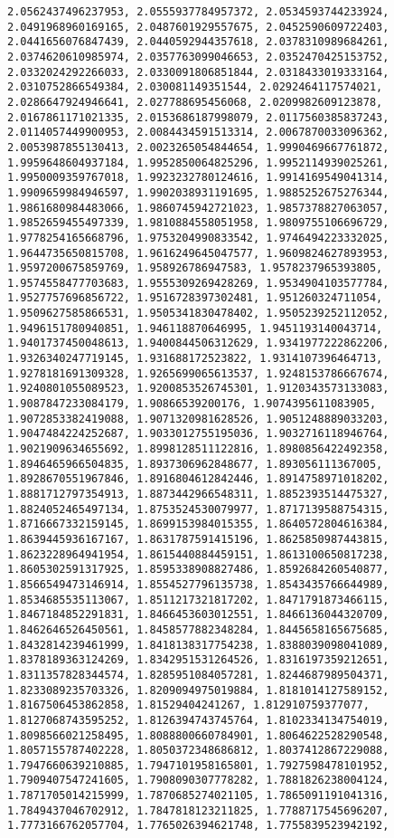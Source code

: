 \documentclass[11pt]{article}
\begin{document}
\begin{Verbatim}[commandchars=\\\{\}]
2.0562437496237953, 2.0555937784957372, 2.0534593744233924, 2.0491968960169165, 2.0487601929557675, 2.0452590609722403, 2.0441656076847439, 2.0440592944357618, 2.0378310989684261, 2.0374620610985974, 2.0357763099046653, 2.0352470425153752, 2.0332024292266033, 2.0330091806851844, 2.0318433019333164, 2.0310752866549384, 2.030081149351544, 2.0292464117574021, 2.0286647924946641, 2.027788695456068, 2.0209982609123878, 2.0167861171021335, 2.0153686187998079, 2.0117560385837243, 2.0114057449900953, 2.0084434591513314, 2.0067870033096362, 2.0053987855130413, 2.0023265054844654, 1.9990469667761872, 1.9959648604937184, 1.9952850064825296, 1.9952114939025261, 1.9950009359767018, 1.9923232780124616, 1.9914169549041314, 1.9909659984946597, 1.9902038931191695, 1.9885252675276344, 1.9861680984483066, 1.9860745942721023, 1.9857378827063057, 1.9852659455497339, 1.9810884558051958, 1.9809755106696729, 1.9778254165668796, 1.9753204990833542, 1.9746494223332025, 1.9644735650815708, 1.9616249645047577, 1.9609824627893953, 1.9597200675859769, 1.958926786947583, 1.9578237965393805, 1.9574558477703683, 1.9555309269428269, 1.9534904103577784, 1.9527757696856722, 1.9516728397302481, 1.951260324711054, 1.9509627585866531, 1.9505341830478402, 1.9505239252112052, 1.9496151780940851, 1.946118870646995, 1.9451193140043714, 1.9401737450048613, 1.9400844506312629, 1.9341977222862206, 1.9326340247719145, 1.931688172523822, 1.9314107396464713, 1.9278181691309328, 1.9265699065613537, 1.9248153786667674, 1.9240801055089523, 1.9200853526745301, 1.9120343573133083, 1.9087847233084179, 1.90866539200176, 1.9074395611083905, 1.9072853382419088, 1.9071320981628526, 1.9051248889033203, 1.9047484224252687, 1.9033012755195036, 1.9032716118946764, 1.9021909634655692, 1.8998128511122816, 1.8980856422492358, 1.8946465966504835, 1.8937306962848677, 1.893056111367005, 1.8928670551967846, 1.8916804612842446, 1.8914758971018202, 1.8881712797354913, 1.8873442966548311, 1.8852393514475327, 1.8824052465497134, 1.8753524530079977, 1.8717139588754315, 1.8716667332159145, 1.8699153984015355, 1.8640572804616384, 1.8639445936167167, 1.8631787591415196, 1.8625850987443815, 1.8623228964941954, 1.8615440884459151, 1.8613100650817238, 1.8605302591317925, 1.8595338908827486, 1.8592684260540877, 1.8566549473146914, 1.8554527796135738, 1.8543435766644989, 1.8534685535113067, 1.8511217321817202, 1.8471791873466115, 1.8467184852291831, 1.8466453603012551, 1.8466136044320709, 1.8462646526450561, 1.8458577882348284, 1.8445658165675685, 1.8432814239461999, 1.8418138317754238, 1.8388039098041089, 1.8378189363124269, 1.8342951531264526, 1.8316197359212651, 1.8311357828344574, 1.8285951084057281, 1.8244687989504371, 1.8233089235703326, 1.8209094975019884, 1.8181014127589152, 1.8167506453862858, 1.81529404241267, 1.812910759377077, 1.8127068743595252, 1.8126394743745764, 1.8102334134754019, 1.8098566021258495, 1.8088800660784901, 1.8064622528290548, 1.8057155787402228, 1.8050372348686812, 1.8037412867229088, 1.7947660639210885, 1.7947101958165801, 1.7927598478101952, 1.7909407547241605, 1.7908090307778282, 1.7881826238004124, 1.7871705014215999, 1.7870685274021105, 1.7865091191041316, 1.7849437046702912, 1.7847818123211825, 1.7788717545696207, 1.7773166762057704, 1.7765026394621748, 1.7755839523942192, 
\end{Verbatim}
\end{document}
